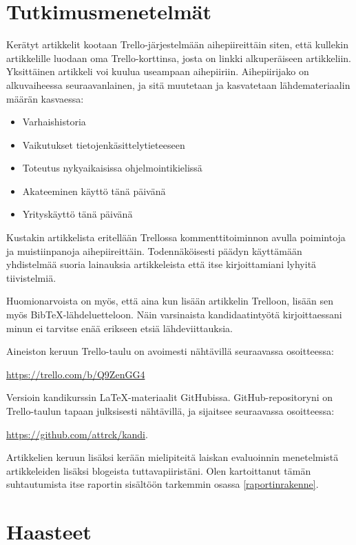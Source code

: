 \documentclass[12pt,a4paper,finnish,oneside]{article}
\begin{document}
\section{Tutkimusmenetelmät}

Kerätyt artikkelit kootaan Trello-järjestelmään aihepiireittäin siten, että kullekin artikkelille luodaan oma Trello-korttinsa, josta on linkki alkuperäiseen artikkeliin. Yksittäinen artikkeli voi kuulua useampaan aihepiiriin. Aihepiirijako on alkuvaiheessa seuraavanlainen, ja sitä muutetaan ja kasvatetaan lähdemateriaalin määrän kasvaessa:

\begin{itemize}
  \item Varhaishistoria
  \item Vaikutukset tietojenkäsittelytieteeseen
  \item Toteutus nykyaikaisissa ohjelmointikielissä
  \item Akateeminen käyttö tänä päivänä
  \item Yrityskäyttö tänä päivänä
\end{itemize}

Kustakin artikkelista eritellään Trellossa kommenttitoiminnon avulla poimintoja ja muistiinpanoja aihepiireittäin. Todennäköisesti päädyn käyttämään yhdistelmää suoria lainauksia artikkeleista että itse kirjoittamiani lyhyitä tiivistelmiä.

Huomionarvoista on myös, että aina kun lisään artikkelin Trelloon, lisään sen myös BibTeX-lähdeluetteloon. Näin varsinaista kandidaatintyötä kirjoittaessani minun ei tarvitse enää erikseen etsiä lähdeviittauksia.

Aineiston keruun Trello-taulu on avoimesti nähtävillä seuraavassa osoitteessa:

\url{https://trello.com/b/Q9ZenGG4}

Versioin kandikurssin \LaTeX-materiaalit GitHubissa. GitHub-repositoryni on Trello-taulun tapaan julksisesti nähtävillä, ja sijaitsee seuraavassa osoitteessa:

\url{https://github.com/attrck/kandi}.

Artikkelien keruun lisäksi kerään mielipiteitä laiskan evaluoinnin menetelmistä artikkeleiden lisäksi blogeista tuttavapiiristäni. Olen kartoittanut tämän suhtautumista itse raportin sisältöön tarkemmin osassa \ref{raportinrakenne}.

\section{Haasteet}
\end{document}
